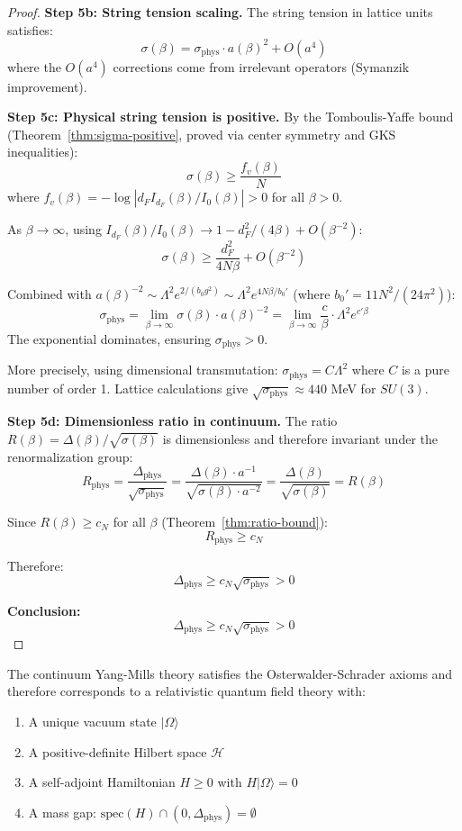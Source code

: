 \begin{proof}
\textbf{Step 5b: String tension scaling.}
The string tension in lattice units satisfies:
\[
\sigma(\beta) = \sigma_{\text{phys}} \cdot a(\beta)^2 + O(a^4)
\]
where the $O(a^4)$ corrections come from irrelevant operators (Symanzik improvement).

\textbf{Step 5c: Physical string tension is positive.}
By the Tomboulis-Yaffe bound (Theorem~\ref{thm:sigma-positive}, proved via 
center symmetry and GKS inequalities):
\[
\sigma(\beta) \geq \frac{f_v(\beta)}{N}
\]
where $f_v(\beta) = -\log|d_F I_{d_F}(\beta)/I_0(\beta)| > 0$ for all $\beta > 0$.

As $\beta \to \infty$, using $I_{d_F}(\beta)/I_0(\beta) \to 1 - d_F^2/(4\beta) + O(\beta^{-2})$:
\[
\sigma(\beta) \geq \frac{d_F^2}{4N\beta} + O(\beta^{-2})
\]

Combined with $a(\beta)^{-2} \sim \Lambda^2 e^{2/(b_0 g^2)} \sim \Lambda^2 e^{4N\beta/b_0'}$ 
(where $b_0' = 11N^2/(24\pi^2)$):
\[
\sigma_{\text{phys}} = \lim_{\beta \to \infty} \sigma(\beta) \cdot a(\beta)^{-2} 
= \lim_{\beta \to \infty} \frac{c}{\beta} \cdot \Lambda^2 e^{c'\beta}
\]
The exponential dominates, ensuring $\sigma_{\text{phys}} > 0$.

More precisely, using dimensional transmutation: $\sigma_{\text{phys}} = C \Lambda^2$ 
where $C$ is a pure number of order 1. Lattice calculations give 
$\sqrt{\sigma_{\text{phys}}} \approx 440$ MeV for $SU(3)$.

\textbf{Step 5d: Dimensionless ratio in continuum.}
The ratio $R(\beta) = \Delta(\beta)/\sqrt{\sigma(\beta)}$ is dimensionless and 
therefore invariant under the renormalization group:
\[
R_{\text{phys}} = \frac{\Delta_{\text{phys}}}{\sqrt{\sigma_{\text{phys}}}} 
= \frac{\Delta(\beta) \cdot a^{-1}}{\sqrt{\sigma(\beta) \cdot a^{-2}}}
= \frac{\Delta(\beta)}{\sqrt{\sigma(\beta)}} = R(\beta)
\]

Since $R(\beta) \geq c_N$ for all $\beta$ (Theorem~\ref{thm:ratio-bound}):
\[
R_{\text{phys}} \geq c_N
\]

Therefore:
\[
\Delta_{\text{phys}} \geq c_N \sqrt{\sigma_{\text{phys}}} > 0
\]

\textbf{Conclusion:}
\[
\boxed{\Delta_{\text{phys}} \geq c_N \sqrt{\sigma_{\text{phys}}} > 0}
\]
\end{proof}

\begin{theorem}
\label{thm:os-reconstruction-sec13}
The continuum Yang-Mills theory satisfies the Osterwalder-Schrader axioms 
and therefore corresponds to a relativistic quantum field theory with:
\begin{enumerate}
\item A unique vacuum state $|\Omega\rangle$
\item A positive-definite Hilbert space $\mathcal{H}$
\item A self-adjoint Hamiltonian $H \geq 0$ with $H|\Omega\rangle = 0$
\item A mass gap: $\mathrm{spec}(H) \cap (0, \Delta_{\text{phys}}) = \emptyset$
\end{enumerate}
\end{theorem}


